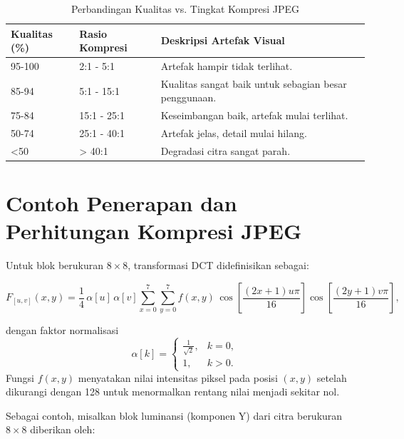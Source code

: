\documentclass[a4paper]{article}
\begin{document}
\begin{table}[h!]
  \centering
  \caption{Perbandingan Kualitas vs. Tingkat Kompresi JPEG}
  \label{tab:kualitas_jpeg}
  \begin{tabular*}{\columnwidth}{@{\extracolsep{\fill}}lll@{}}
    \toprule
    \textbf{Kualitas (\%)} & \textbf{Rasio Kompresi} & \textbf{Deskripsi Artefak Visual}                     \\ \midrule
    95-100                 & 2:1 - 5:1               & Artefak hampir tidak terlihat.                        \\
    85-94                  & 5:1 - 15:1              & Kualitas sangat baik untuk sebagian besar penggunaan. \\
    75-84                  & 15:1 - 25:1             & Keseimbangan baik, artefak mulai terlihat.            \\
    50-74                  & 25:1 - 40:1             & Artefak jelas, detail mulai hilang.                   \\
    <50                    & > 40:1                  & Degradasi citra sangat parah.                         \\ \bottomrule
  \end{tabular*}
\end{table}

\section{Contoh Penerapan dan Perhitungan Kompresi JPEG}
Untuk blok berukuran $8\times8$, transformasi DCT didefinisikan sebagai:

\begin{equation}
  F_{[u,v]}(x,y) = \frac{1}{4} \, \alpha[u]\,\alpha[v]
  \sum_{x=0}^{7}\sum_{y=0}^{7}
  f(x,y)\,
  \cos\!\left[\frac{(2x+1)u\pi}{16}\right]
  \cos\!\left[\frac{(2y+1)v\pi}{16}\right],
\end{equation}

dengan faktor normalisasi
\[
  \alpha[k] =
  \begin{cases}
    \frac{1}{\sqrt{2}}, & k = 0, \\[6pt]
    1,                  & k > 0.
  \end{cases}
\]
Fungsi $f(x,y)$ menyatakan nilai intensitas piksel pada posisi $(x,y)$ setelah dikurangi dengan 128 untuk menormalkan rentang nilai menjadi sekitar nol.

Sebagai contoh, misalkan blok luminansi (komponen Y) dari citra berukuran $8\times8$ diberikan oleh:
\end{document}
